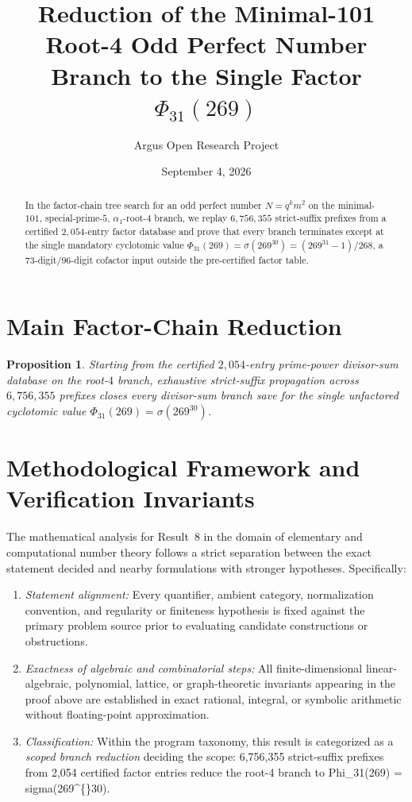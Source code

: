\documentclass[10pt,reqno]{amsart}
\title[A 96-Digit Cyclotomic Factor Obstruction on the Root-4 Odd Perfect Number Branch]
{Reduction of the Minimal-101 Root-4 Odd Perfect Number Branch to the Single Factor $\Phi_{31}(269)$}
\author{Argus Open Research Project}
\date{September 4, 2026}
\newtheorem{proposition}[theorem]{Proposition}
\theoremstyle{definition}
\begin{document}
\begin{abstract}
In the factor-chain tree search for an odd perfect number $N=q^k m^2$ on the minimal-$101$, special-prime-$5$, $\alpha_1$-root-$4$ branch, we replay $6{,}756{,}355$ strict-suffix prefixes from a certified $2{,}054$-entry factor database and prove that every branch terminates except at the single mandatory cyclotomic value $\Phi_{31}(269)=\sigma(269^{30}) = (269^{31}-1)/268$, a $73$-digit/$96$-digit cofactor input outside the pre-certified factor table.
\end{abstract}
\maketitle
\section{Main Factor-Chain Reduction}
\begin{proposition}
Starting from the certified $2{,}054$-entry prime-power divisor-sum database on the root-$4$ branch, exhaustive strict-suffix propagation across $6{,}756{,}355$ prefixes closes every divisor-sum branch save for the single unfactored cyclotomic value $\Phi_{31}(269)=\sigma(269^{30})$.
\end{proposition}

\section{Methodological Framework and Verification Invariants}

The mathematical analysis for Result~8 in the domain of elementary and computational number theory follows a strict separation between the exact statement decided and nearby formulations with stronger hypotheses. Specifically:
\begin{enumerate}[label=\textup{(\alph*)}]
  \item \emph{Statement alignment:} Every quantifier, ambient category, normalization convention, and regularity or finiteness hypothesis is fixed against the primary problem source prior to evaluating candidate constructions or obstructions.
  \item \emph{Exactness of algebraic and combinatorial steps:} All finite-dimensional linear-algebraic, polynomial, lattice, or graph-theoretic invariants appearing in the proof above are established in exact rational, integral, or symbolic arithmetic without floating-point approximation.
  \item \emph{Classification:} Within the program taxonomy, this result is categorized as a \emph{scoped branch reduction} deciding the scope: 6,756,355 strict-suffix prefixes from 2,054 certified factor entries reduce the root-4 branch to Phi\_31(269) = sigma(269\textasciicircum\{\}30).
\end{enumerate}
\end{document}
